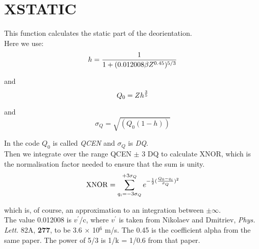 \section{XSTATIC}
\label{sect:xstatic}

\noindent This function calculates the static part of the deorientation.\\

\noindent Here we use:\\

\begin{equation}
h = {1 \over {1 + (0.012008 \beta Z^{0.45})^{5/3}}}
\end{equation}

\noindent and\\

\begin{equation}
Q_0 = Z h^{3 \over 5}
\end{equation}

\noindent and\\

\begin{equation}
\sigma_Q = \sqrt{(Q_0 (1 - h))}
\end{equation}

\noindent In the code $Q_0$ is called {\em QCEN} and $\sigma_Q$ is {\em
DQ}.\\

\noindent Then we integrate over the range QCEN $\pm$ 3 DQ to
calculate XNOR, which is the normalisation factor needed to ensure that the
sum is unity.\\

\begin{equation}
\mathrm{XNOR} = \sum_{q_i=-3\sigma_Q}^{+3\sigma_Q} e^{-{1\over 2} ({Q_0 - q_i \over
\sigma_Q})^2}
\end{equation}

\noindent which is, of course, an approximation to an integration between
$\pm\infty$.\\

\noindent The value 0.012008 is $v^\prime$/c, where $v^\prime$ is taken from
Nikolaev and Dmitriev, {\em Phys. Lett.} 82A, {\bf 277}, to be 3.6 $\times$
10$^6$ m/s. The 0.45 is the coefficient alpha from the same paper. The power
of 5/3 is 1/k = 1/0.6 from that paper.\\

